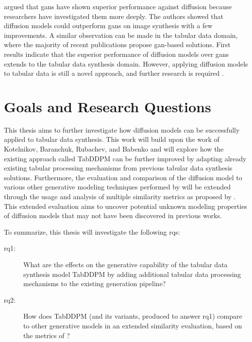 \textcite{dhariwal2021DiffusionModelsBeat} argued that \glspl{gan} have shown superior performance against diffusion because researchers have investigated them more deeply.
The authors showed that diffusion \glspl{model} could outperform \glspl{gan} on image synthesis with a few improvements.
A similar observation can be made in the tabular data domain, where the majority of recent publications propose \gls{gan}-based solutions.
First results \cite{kotelnikov2022TabDDPMModellingTabular} indicate that the superior performance of diffusion \glspl{model} over \glspl{gan} extends to the tabular data synthesis domain.
However, applying diffusion \glspl{model} to tabular data is still a novel approach, and further research is required \cite{borisov2022DeepNeuralNetworks}.


\section{Goals and Research Questions}
\label{ch:intro-goals}
This thesis aims to further investigate how diffusion \glspl{model} can be successfully applied to tabular data synthesis.
This work will build upon the work of Kotelnikov, Baranchuk, Rubachev, and Babenko \cite{kotelnikov2022TabDDPMModellingTabular} and will explore how the existing approach called TabDDPM can be further improved by adapting
already existing tabular processing mechanisms from previous tabular data synthesis solutions.
Furthermore, the evaluation and comparison of the diffusion \gls{model} to various other generative modeling techniques performed by \textcite{kotelnikov2022TabDDPMModellingTabular} will be extended through the usage and analysis
of multiple similarity metrics as proposed by \textcite{chundawat2022UniversalMetricRobust}.
This extended evaluation aims to uncover potential unknown modeling properties of diffusion \glspl{model} that may not have been discovered in previous works.

To summarize, this thesis will investigate the following \glspl{rq}:

\begin{description}
	\item[\gls{rq}1:] What are the effects on the generative capability of the tabular data synthesis \gls{model} TabDDPM by adding additional tabular data processing mechanisms to the existing generation pipeline?
	\item[\gls{rq}2:] How does TabDDPM (and its variants, produced to answer \gls{rq}1) compare to other generative \glspl{model} in an extended similarity evaluation, based on the metrics of \textcite{chundawat2022UniversalMetricRobust}?
\end{description}

